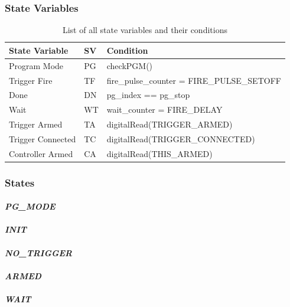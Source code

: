\subsubsection{State Variables}

\begin{table}[!ht]
\centering
\begin{tabular}{|l|l|l|} 
\hline
State Variable    & SV & Condition                                   \\ 
\hline \hline
Program Mode      & PG & checkPGM()                                  \\ 
\hline
Trigger Fire      & TF & fire\_pulse\_counter = FIRE\_PULSE\_SETOFF  \\ 
\hline
Done              & DN & pg\_index == pg\_stop                       \\ 
\hline
Wait              & WT & wait\_counter = FIRE\_DELAY                 \\ 
\hline
Trigger Armed     & TA & digitalRead(TRIGGER\_ARMED)                 \\ 
\hline
Trigger Connected & TC & digitalRead(TRIGGER\_CONNECTED)             \\ 
\hline
Controller Armed  & CA & digitalRead(THIS\_ARMED)                    \\
\hline
\end{tabular}	
\caption{List of all state variables and their conditions}
\label{tab:state_vars_list}
\end{table}

\pagebreak

\subsubsection{States}
\paragraph{\textit{PG\_MODE}}
\paragraph{\textit{INIT}}
\paragraph{\textit{NO\_TRIGGER}}
\paragraph{\textit{ARMED}}
\paragraph{\textit{WAIT}}
